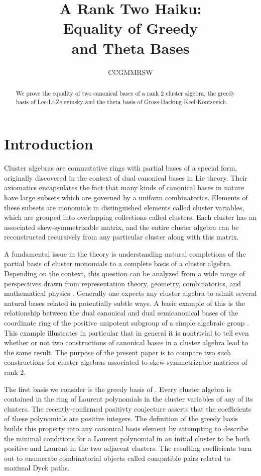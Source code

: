 \documentclass[11pt]{amsart}
\title{A Rank Two Haiku:\\ Equality of Greedy \\ and Theta Bases}
\author{CCGMMRSW}
\theoremstyle{remark}
\numberwithin{equation}{section}
\begin{document}
\maketitle

\begin{abstract}
We prove the equality of two canonical bases of a rank 2 cluster algebra, the greedy basis of Lee-Li-Zelevinsky and the theta basis of Gross-Hacking-Keel-Kontsevich.
\end{abstract}

\section{Introduction}

Cluster algebras are commutative rings with partial bases of a special form, originally discovered in the context of dual canonical bases in Lie theory.  Their axiomatics encapsulates the fact that many kinds of canonical bases in nature have large subsets which are governed by a uniform combinatorics.  Elements of these subsets are monomials in distinguished elements called cluster variables, which are grouped into overlapping collections called clusters.  Each cluster has an associated skew-symmetrizable matrix, and the entire cluster algebra can be reconstructed recursively from any particular cluster along with this matrix.

A fundamental issue in the theory is understanding natural completions of the partial basis of cluster monomials to a complete basis of a cluster algebra.  Depending on the context, this question can be analyzed from a wide range of perspectives drawn from representation theory, geometry, combinatorics, and mathematical physics \cite{???}.  Generally one expects any cluster algebra to admit several natural bases related in potentially subtle ways.  A basic example of this is the relationship between the dual canonical and dual semicanonical bases of the coordinate ring of the positive unipotent subgroup of a simple algebraic group \cite{???}.  This example illustrates in particular that in general it is nontrivial to tell even whether or not two constructions of canonical bases in a cluster algebra lead to the same result.  The purpose of the present paper is to compare two such constructions for cluster algebras associated to skew-symmetrizable matrices of rank 2.  

The first basis we consider is the greedy basis of \cite{LLZ}.  Every cluster algebra is contained in the ring of Laurent polynomials in the cluster variables of any of its clusters.  The recently-confirmed positivty conjecture asserts that the coefficients of these polynomials are positive integers.  The definition of the greedy basis builds this property into any canonical basis element by attempting to describe the minimal conditions for a Laurent polynomial in an initial cluster to be both positive and Laurent in the two adjacent clusters.  The resulting coefficients turn out to enumerate combinatorial objects called compatible pairs related to maximal Dyck paths.  
\end{document}
